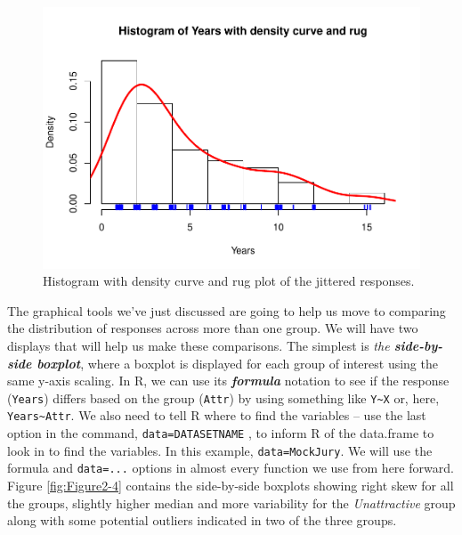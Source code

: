 \documentclass[]{book}
\newenvironment{Shaded}{\begin{snugshade}}{\end{snugshade}}
\newcommand{\KeywordTok}[1]{\textcolor[rgb]{0.13,0.29,0.53}{\textbf{#1}}}
\newcommand{\DataTypeTok}[1]{\textcolor[rgb]{0.13,0.29,0.53}{#1}}
\newcommand{\DecValTok}[1]{\textcolor[rgb]{0.00,0.00,0.81}{#1}}
\newcommand{\StringTok}[1]{\textcolor[rgb]{0.31,0.60,0.02}{#1}}
\newcommand{\OperatorTok}[1]{\textcolor[rgb]{0.81,0.36,0.00}{\textbf{#1}}}
\newcommand{\NormalTok}[1]{#1}
\begin{document}
\begin{Shaded}
\end{Shaded}

\begin{figure}
\centering
\includegraphics{GreenwoodBanner_files/figure-latex/Figure2-3-1.pdf}
\caption{\label{fig:Figure2-3}Histogram with density curve and rug plot of the jittered
responses.}
\end{figure}

The graphical tools we've just discussed are going to help us move to
comparing the distribution of responses across more than one group. We
will have two displays that will help us make these comparisons. The
simplest is \emph{the \textbf{side-by-side boxplot}}, where a boxplot is
displayed for each group of interest using the same y-axis scaling. In
R, we can use its \textbf{\emph{formula}} notation to see if the
response (\texttt{Years}) differs based on the group (\texttt{Attr}) by
using something like \texttt{Y\textasciitilde{}X} or, here,
\texttt{Years\textasciitilde{}Attr}. We also need to tell R where to
find the variables -- use the last option in the command,
\texttt{data=DATASETNAME} , to inform R of the data.frame to look in to
find the variables. In this example, \texttt{data=MockJury}. We will use
the formula and \texttt{data=...} options in almost every function we
use from here forward. Figure \ref{fig:Figure2-4} contains the
side-by-side boxplots showing right skew for all the groups, slightly
higher median and more variability for the \emph{Unattractive} group
along with some potential outliers indicated in two of the three groups.
\end{document}
